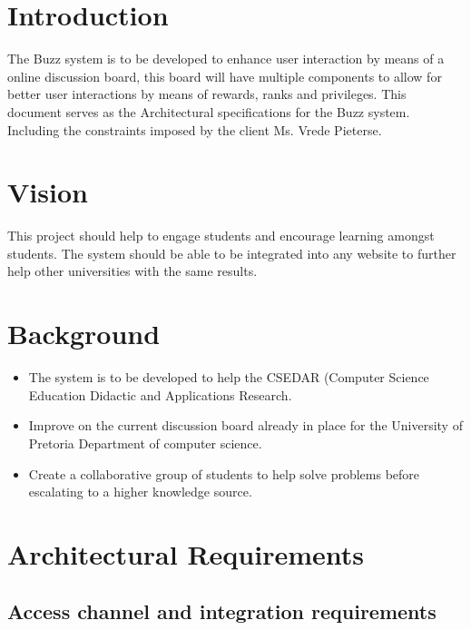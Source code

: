 \documentclass[10pt]{article}
\begin{document}

\newpage
\tableofcontents
\newpage

\section{Introduction}
The Buzz system is to be developed to enhance user interaction by means of a online discussion board, this board will have multiple components to allow for better user interactions by means of rewards, ranks and privileges. This document serves as the Architectural specifications for the Buzz system. Including the constraints imposed by the client Ms. Vrede Pieterse.

\section{Vision}
This project should help to engage students and encourage learning amongst students. The system should be able to be integrated into any website to further help other universities with the same results.

\section{Background}
\begin{itemize}
\item The system is to be developed to help the CSEDAR (Computer Science Education Didactic and Applications Research.
\item Improve on the current discussion board already in place for the University of Pretoria Department of computer science.
\item Create a collaborative group of students to help solve problems before escalating to a higher knowledge source.
\end{itemize}


\section{Architectural Requirements}
\subsection{Access channel and integration requirements} %
\end{document}

